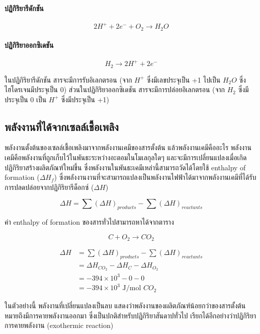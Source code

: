 \documentclass[11pt]{article}
\begin{document}
\paragraph{ปฏิกิริยารีดักชัน}

$$ 2H^+ + 2e^- + O_2 \rightarrow H_2O $$

\paragraph{ปฏิกิริยาออกซิเดชัน}

$$ H_2 \rightarrow 2H^+ + 2e^- $$

ในปฏิกิริยารีดักชัน สารจะมีการรับอิเลกตรอน (จาก \(H^+\) ซึ่งมีเลขประจุเป็น +1 ไปเป็น \(H_2O\) ซึ่งไฮโดรเจนมีประจุเป็น 0) ส่วนในปฏิกิริยาออกซิเดชัน สารจะมีการปล่อยอิเลกตรอน (จาก \(H_2\) ซึ่งมีประจุเป็น 0 เป็น \(H^+\) ซึ่งมีประจุเป็น +1)

\subsection{พลังงานที่ได้จากเซลล์เชื้อเพลิง}
\label{sec:orgf9bc12a}

พลังงานตั้งต้นของเซลล์เชื้อเพลิงมาจากพลังงานเคมีของสารตั้งต้น แล้วพลังงานเคมีคืออะไร พลังงานเคมีคือพลังงานที่ถูกเก็บไว้ในพันธะระหว่างอะตอมในโมเลกุลใดๆ และจะมีการเปลี่ยนแปลงเมื่อเกิดปฏิกิริยาสร้างผลิตภัณฑ์ใหม่ขึ้น ซึ่งพลังงานในพันธะเคมีเหล่านี้สามารถวัดได้โดยใช้ enthalpy of formation (\(\Delta H_f\)) ซึ่งพลังงานงานที่จะสามารถแปลงเป็นพลังงานไฟฟ้าได้มาจากพลังงานเคมีที่ได้รับการปลดปล่อยจากปฏิกิริยารีด็อกซ์ (\(\Delta H\))

$$ \Delta H = \sum (\Delta H)_{products} - \sum (\Delta H)_{reactants} $$

ค่า enthalpy of formation ของสารทั่วไปสามารถหาได้จากตาราง

\begin{equation*}
  C + O_2 \rightarrow CO_2
\end{equation*}

\begin{align*}
  \Delta H &= \sum (\Delta H)_{products} - \sum (\Delta H)_{reactants} \\
           &= \Delta H_{CO_2} - \Delta H_C - \Delta H_{O_2} \\
           &= -394 \times 10^3 - 0 - 0 \\
           &= -394 \times 10^3 \text{ J/mol } CO_2
\end{align*}

ในตัวอย่างนี้ พลังงานที่เปลี่ยนแปลงเป็นลบ แสดงว่าพลังงานของผลิตภัณฑ์น้อยกว่าของสารตั้งต้น หมายถึงมีการคายพลังงานออกมา ซึ่งเป็นปกติสำหรับปฏิกิริยาสันดาปทั่วไป เรียกได้อีกอย่างว่าปฏิกิริยาการคายพลังงาน (exothermic reaction)
\end{document}
